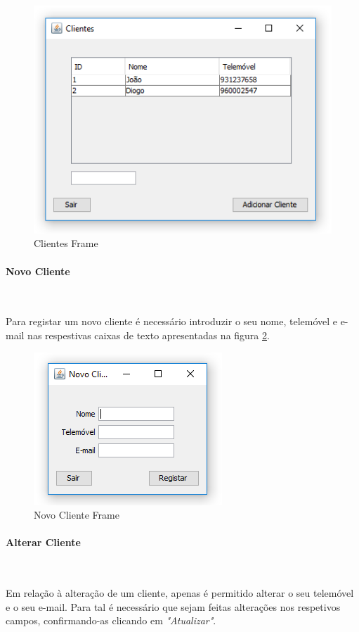 \documentclass[11pt]{article} %
\newcommand{\myparagraph}[1]{\paragraph{#1}\mbox{}\\}
\begin{document}
\begin{figure}[H]
	\centering
	\includegraphics[]{clientesframe.png}
	\caption{Clientes Frame}
	\label{clientesframe}
\end{figure}


\myparagraph{Novo Cliente}
\label{novocliente} 

Para registar um novo cliente é necessário introduzir o seu nome, telemóvel e e-mail nas respestivas caixas de texto apresentadas na figura \ref{novoclienteframe}.

\begin{figure}[H]
	\centering
	\includegraphics[]{novoclienteframe.png}
	\caption{Novo Cliente Frame}
	\label{novoclienteframe}
\end{figure}


\myparagraph{Alterar Cliente}
\label{alterarcliente}

Em relação à alteração de um cliente, apenas é permitido alterar o seu telemóvel e o seu e-mail. Para tal é necessário que sejam feitas alterações nos respetivos campos, confirmando-as clicando em \textit{"Atualizar"}.
\end{document}
